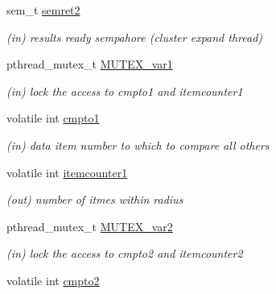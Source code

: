 \begin{DoxyCompactItemize}
sem\+\_\+t \mbox{\hyperlink{structdbscan__pt_a229860660f580c96e3f00820dedc314f}{semret2}}
\begin{DoxyCompactList}\small\item\em (in) results ready sempahore (cluster expand thread) \end{DoxyCompactList}\item 
\mbox{\label{structdbscan__pt_aecd4ee021a0d72191163f578644813b4}} 
pthread\+\_\+mutex\+\_\+t \mbox{\hyperlink{structdbscan__pt_aecd4ee021a0d72191163f578644813b4}{M\+U\+T\+E\+X\+\_\+var1}}
\begin{DoxyCompactList}\small\item\em (in) lock the access to cmpto1 and itemcounter1 \end{DoxyCompactList}\item 
\mbox{\label{structdbscan__pt_a50b8b3c19e72c2496e04595da3466fc6}} 
volatile int \mbox{\hyperlink{structdbscan__pt_a50b8b3c19e72c2496e04595da3466fc6}{cmpto1}}
\begin{DoxyCompactList}\small\item\em (in) data item number to which to compare all others \end{DoxyCompactList}\item 
\mbox{\label{structdbscan__pt_af71b0c6290be59f918f5fded65ca5aa0}} 
volatile int \mbox{\hyperlink{structdbscan__pt_af71b0c6290be59f918f5fded65ca5aa0}{itemcounter1}}
\begin{DoxyCompactList}\small\item\em (out) number of itmes within radius \end{DoxyCompactList}\item 
\mbox{\label{structdbscan__pt_ad60703d4e4e49b5676c314ffacdd3cc6}} 
pthread\+\_\+mutex\+\_\+t \mbox{\hyperlink{structdbscan__pt_ad60703d4e4e49b5676c314ffacdd3cc6}{M\+U\+T\+E\+X\+\_\+var2}}
\begin{DoxyCompactList}\small\item\em (in) lock the access to cmpto2 and itemcounter2 \end{DoxyCompactList}\item 
\mbox{\label{structdbscan__pt_ae90fa8f34589191559422b8d49321675}} 
volatile int \mbox{\hyperlink{structdbscan__pt_ae90fa8f34589191559422b8d49321675}{cmpto2}}

\end{DoxyCompactItemize}
